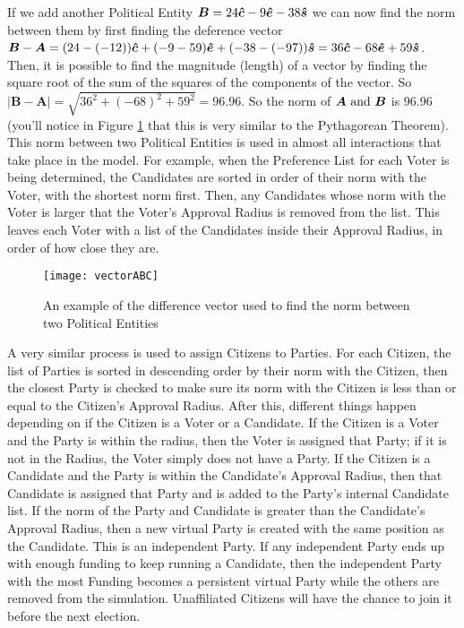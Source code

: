 \documentclass[12pt]{article}
\newcommand{\civ}{\vhat{c}}
\newcommand{\econ}{\vhat{e}}
\newcommand{\soc}{\vhat{s}}
\begin{document}
\qquad If we add another Political Entity $\bm{B} = 24\civ - 9\econ - 38\soc$ we can now find the norm between them by first finding the deference vector $\bm{B} - \bm{A} = (24 - (- 12))\civ + (-9 - 59)\econ + (-38 - (- 97))\soc = 36\civ - 68\econ + 59\soc$. Then, it is possible to find the magnitude (length) of a vector by finding the square root of the sum of the squares of the components of the vector. So $|\bm{B} - \bm{A}| = \sqrt{36^2 + (-68)^2 + 59^2} = 96.96$. So the norm of $\bm{A} \hbox{ and } \bm{B}$ is 96.96 (you'll notice in Figure \ref{exNorm} that this is very similar to the Pythagorean Theorem). This norm between two Political Entities is used in almost all interactions that take place in the model. For example, when the Preference List for each Voter is being determined, the Candidates are sorted in order of their norm with the Voter, with the shortest norm first. Then, any Candidates whose norm with the Voter is larger that the Voter's Approval Radius is removed from the list. This leaves each Voter with a list of the Candidates inside their Approval Radius, in order of how close they are.
\begin{figure}[H]
\centering
\texttt{[image: vectorABC]}
\caption{\footnotesize An example of the difference vector used to find the norm between two Political Entities}
\label{exNorm}
\end{figure}

\qquad A very similar process is used to assign Citizens to Parties. For each Citizen, the list of Parties is sorted in descending order by their norm with the Citizen, then the closest Party is checked to make sure its norm with the Citizen is less than or equal to the Citizen's Approval Radius. After this, different things happen depending on if the Citizen is a Voter or a Candidate. If the Citizen is a Voter and the Party is within the radius, then the Voter is assigned that Party; if it is not in the Radius, the Voter simply does not have a Party. If the Citizen is a Candidate and the Party is within the Candidate's Approval Radius, then that Candidate is assigned that Party and is added to the Party's internal Candidate list. If the norm of the Party and Candidate is greater than the Candidate's Approval Radius, then a new virtual Party is created with the same position as the Candidate. This is an independent Party. If any independent Party ends up with enough funding to keep running a Candidate, then the independent Party with the most Funding becomes a persistent virtual Party while the others are removed from the simulation. Unaffiliated Citizens will have the chance to join it before the next election. \\
\end{document}
